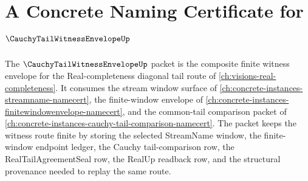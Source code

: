 \chapter{A Concrete Naming Certificate for $\CauchyTailWitnessEnvelopeUp$}
\label{ch:concrete-instances-cauchy-tail-witness-envelope-namecert}

The $\CauchyTailWitnessEnvelopeUp$ packet is the composite finite witness envelope for the Real-completeness diagonal tail route of \autoref{ch:visions-real-completeness}. It consumes the stream window surface of \autoref{ch:concrete-instances-streamname-namecert}, the finite-window envelope of \autoref{ch:concrete-instances-finitewindowenvelope-namecert}, and the common-tail comparison packet of \autoref{ch:concrete-instances-cauchy-tail-comparison-namecert}. The packet keeps the witness route finite by storing the selected StreamName window, the finite-window endpoint ledger, the Cauchy tail-comparison row, the RealTailAgreementSeal row, the RealUp readback row, and the structural provenance needed to replay the same route.

